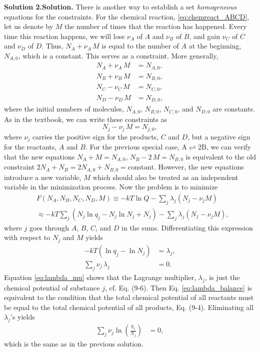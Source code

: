 \documentclass[twocolumn, 10pt]{article}
\numberwithin{equation}{section}
\newenvironment{solution}[1][\empty]
{\par\medskip\sffamily
  \textbf{\ifx\empty#1{Solution.}\relax\else{#1}\fi} \ignorespaces}
{\medskip}
\begin{document}
\begin{solution}[Solution 2.]
  There is another way to establish a set \emph{homogeneous} equations
  for the constraints.
  For the chemical reaction, \eqref{eq:chemreact_ABCD},
  let us denote by $M$ the number of times that the reaction has happened.
  Every time this reaction happens,
  we will lose $\nu_A$ of $A$ and $\nu_B$ of $B$,
  and gain $\nu_C$ of $C$ and $\nu_D$ of $D$.
  Thus, $N_A + \nu_A \, M$ is equal to the number of $A$ at the beginning,
  $N_{A,0}$, which is a constant.
  This serves as a constraint.
  More generally,
  \begin{align*}
    N_A + \nu_A \, M &= N_{A,0}, \\
    N_B + \nu_B \, M &= N_{B,0}, \\
    N_C - \nu_C \, M &= N_{C,0}, \\
    N_D - \nu_D \, M &= N_{D,0},
  \end{align*}
  where the initial numbers of molecules,
  $N_{A,0}$, $N_{B,0}$, $N_{C,0}$, and $N_{D,0}$ are constants.
  As in the textbook, we can write these constraints as
  $$
  N_j - \nu_j \, M = N_{j,0},
  $$
  where $\nu_j$ carries the positive sign for the products, $C$ and $D$,
  but a negative sign for the reactants, $A$ and $B$.
  For the previous special case, $\mathrm{A} \rightleftharpoons 2\mathrm{B}$,
  we can verify that the new equations
  $N_A + M = N_{A,0}$, $N_B - 2 \, M = N_{B,0}$
  is equivalent to the old constraint
  $2 N_A + N_B = 2 N_{A, 0} + N_{B,0} = \mathrm{constant}$.
  However, the new equations introduce a new variable, $M$
  which should also be treated as an independent variable
  in the minimization process.
  Now the problem is to minimize
  \begin{align*}
    &F(N_A, N_B, N_C, N_D, M)
    \equiv -k T \ln Q
    - \sum_j\lambda_j (N_j - \nu_j M)
    \\
    &\approx
    -kT \sum_j (N_j \ln q_j - N_j \ln N_j + N_j)
    - \sum_j \lambda_j (N_j - \nu_j M)
    ,
  \end{align*}
  where $j$ goes through $A$, $B$, $C$, and $D$ in the sums.
%
  Differentiating this expression with respect to $N_j$ and $M$ yields
  \begin{align}
    -kT (\ln q_j - \ln N_j) &= \lambda_j,
    \label{eq:lambda_mu}
    \\
    \sum_{j}
    \nu_j \, \lambda_j
    &=
    0
    .
    \label{eq:lambda_balance}
  \end{align}
  Equation \eqref{eq:lambda_mu} shows that
  the Lagrange multiplier, $\lambda_j$,
  is just the chemical potential of substance $j$,
  cf. Eq. (9-6).
  Then Eq. \eqref{eq:lambda_balance} is
  equivalent to the condition that
  the total chemical potential of all reactants
  must be equal to the total chemical potential
  of all products, Eq. (9-4).
  Eliminating all $\lambda_j$'s yields
  \begin{align*}
    \sum_j \nu_j \ln\left( \frac{q_j}{N_j} \right)
    &=
    0
    ,
  \end{align*}
  which is the same as in the previous solution.
\end{solution}
\end{document}

